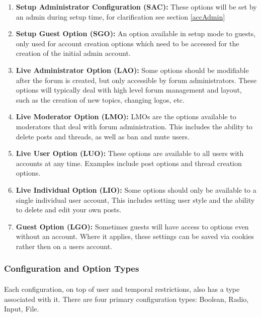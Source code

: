 \documentclass[]{article}
\begin{document}
\begin{enumerate}
    \item \textbf{Setup Administrator Configuration (SAC):} These options will be set by an admin during setup time, for clarification see section \ref{accAdmin}  
    \item \textbf{Setup Guest Option (SGO):} An option available in setup mode to guests, only used for account creation options which need to be accessed for the creation of the initial admin account. 
    \item \textbf{Live Administrator Option (LAO):} Some options should be modifiable after the forum is created, but only accessible by forum administrators. These options will typically deal with high level forum management and layout, such as the creation of new topics, changing logos, etc. 
    \item \textbf{Live Moderator Option (LMO):} LMOs are the options available to moderators that deal with forum administration. This includes the ability to delete posts and threads, as well as ban and mute users. 
    \item \textbf{Live User Option (LUO):} These options are available to all users with accounts at any time. Examples include post options and thread creation options.  
    \item \textbf{Live Individual Option (LIO):} Some options should only be available to a single individual user account, This includes setting user style and the ability to delete and edit your own posts.  
    \item \textbf{Guest Option (LGO):} Sometimes guests will have access to options even without an account. Where it applies, these settings can be saved via cookies rather then on a users account. 
\end{enumerate}
\subsubsection{Configuration and Option Types}\label{configTypes}
\paragraph{}
Each configuration, on top of user and temporal restrictions, also has a type associated with it. There are four primary configuration types: Boolean, Radio, Input, File.
\end{document}
